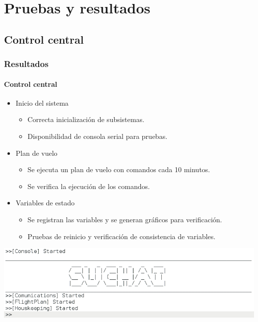 \documentclass[xcolor=dvipsnames]{beamer}
\begin{document}
    \section{Pruebas y resultados}
    \subsection{Control central}
    \begin{frame}[squeeze]
        \frametitle{Resultados}
        \framesubtitle{Control central}
        
        \begin{itemize}
            \item Inicio del sistema
                \begin{itemize}
                    \item Correcta inicialización de subsistemas.
                    \item Disponibilidad de consola serial para pruebas.
                \end{itemize}
            \item Plan de vuelo
            \begin{itemize}
                \item Se ejecuta un plan de vuelo con comandos cada 10 minutos.
                \item Se verifica la ejecución de los comandos.
            \end{itemize}
            \item Variables de estado
            \begin{itemize}
                \item Se registran las variables y se generan gráficos para verificación.
                \item Pruebas de reinicio y verificación de consistencia de variables.
            \end{itemize}
        \end{itemize}
        
        \begin{center}
            \includegraphics[height=0.35\textheight]{img/prompt.png}
        \end{center}

    \end{frame}
    
\end{document}
